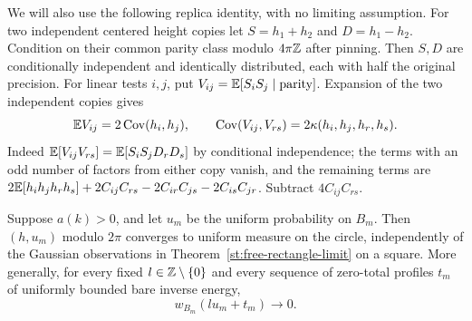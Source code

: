 We will also use the following replica identity, with no limiting assumption.
For two independent centered height copies let $S=h_1+h_2$ and $D=h_1-h_2$.
Condition on their common parity class modulo $4\pi\mathbb Z$ after pinning.
Then $S,D$ are conditionally independent and identically distributed,
each with half the original precision. For linear tests $i,j$, put
$V_{ij}=\mathbb E[S_iS_j\mid\text{parity}]$. Expansion of the two independent
copies gives
\begin{equation}\label{st:replica-covariance}
 \mathbb E V_{ij}=2\operatorname{Cov}(h_i,h_j),\qquad
 \operatorname{Cov}(V_{ij},V_{rs})=2\kappa(h_i,h_j,h_r,h_s).
\end{equation}
Indeed $\mathbb E[V_{ij}V_{rs}]=\mathbb E[S_iS_jD_rD_s]$ by conditional independence;
the terms with an odd number of factors from either copy vanish, and the
remaining terms are $2\mathbb E[h_ih_jh_rh_s]+2C_{ij}C_{rs}
-2C_{ir}C_{js}-2C_{is}C_{jr}$. Subtract $4C_{ij}C_{rs}$.

\begin{theorem}\label{st:fractional-mean}
Suppose $a(k)>0$, and let $u_m$ be the uniform probability on $B_m$.
Then $(h,u_m)$ modulo $2\pi$ converges to uniform measure on the circle,
independently of the Gaussian observations in
Theorem~\ref{st:free-rectangle-limit} on a square. More generally, for every
fixed $l\in\mathbb Z\setminus\{0\}$ and every sequence of zero-total profiles
$t_m$ of uniformly bounded bare inverse energy,
\begin{equation}\label{st:vanishing-phase}
 w_{B_m}(lu_m+t_m)\longrightarrow0.
\end{equation}
\end{theorem}

